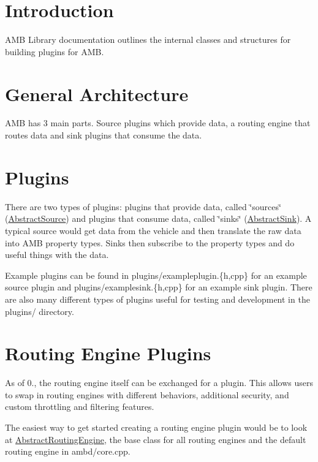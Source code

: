 \hypertarget{index_intro}{}\section{Introduction}\label{index_intro}
A\-M\-B Library documentation outlines the internal classes and structures for building plugins for A\-M\-B.\hypertarget{index_architecture}{}\section{General Architecture}\label{index_architecture}
A\-M\-B has 3 main parts. Source plugins which provide data, a routing engine that routes data and sink plugins that consume the data.\hypertarget{index_plugins}{}\section{Plugins}\label{index_plugins}
There are two types of plugins\-: plugins that provide data, called \char`\"{}sources\char`\"{} (\hyperlink{classAbstractSource}{Abstract\-Source}) and plugins that consume data, called \char`\"{}sinks\char`\"{} (\hyperlink{classAbstractSink}{Abstract\-Sink}). A typical source would get data from the vehicle and then translate the raw data into A\-M\-B property types. Sinks then subscribe to the property types and do useful things with the data.

Example plugins can be found in plugins/exampleplugin.\{h,cpp\} for an example source plugin and plugins/examplesink.\{h,cpp\} for an example sink plugin. There are also many different types of plugins useful for testing and development in the plugins/ directory.\hypertarget{index_routing_engine}{}\section{Routing Engine Plugins}\label{index_routing_engine}
As of 0., the routing engine itself can be exchanged for a plugin. This allows users to swap in routing engines with different behaviors, additional security, and custom throttling and filtering features.

The easiest way to get started creating a routing engine plugin would be to look at \hyperlink{classAbstractRoutingEngine}{Abstract\-Routing\-Engine}, the base class for all routing engines and the default routing engine in ambd/core.\-cpp. 